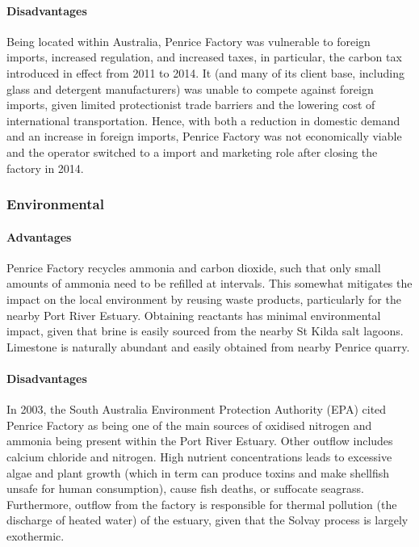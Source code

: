 \documentclass[12pt, a4paper]{article}
\begin{document}
\paragraph{Disadvantages}

Being located within Australia, Penrice Factory was vulnerable to foreign imports, increased regulation, and increased taxes, in particular, the carbon tax introduced in effect from 2011 to 2014. It (and many of its client base, including glass and detergent manufacturers) was unable to compete against foreign imports, given limited protectionist trade barriers and the lowering cost of international transportation. Hence, with both a reduction in domestic demand and an increase in foreign imports, Penrice Factory was not economically viable and the operator switched to a import and marketing role after closing the factory in 2014.

\subsubsection{Environmental}

\paragraph{Advantages}
Penrice Factory recycles ammonia and carbon dioxide, such that only small amounts of ammonia need to be refilled at intervals. This somewhat mitigates the impact on the local environment by reusing waste products, particularly for the nearby Port River Estuary. Obtaining reactants has minimal environmental impact, given that brine is easily sourced from the nearby St Kilda salt lagoons. Limestone is naturally abundant and easily obtained from nearby Penrice quarry.

\paragraph{Disadvantages}
In 2003, the South Australia Environment Protection Authority (EPA) cited Penrice Factory as being one of the main sources of oxidised nitrogen and ammonia being present within the Port River Estuary. Other outflow includes calcium chloride and nitrogen. High nutrient concentrations leads to excessive algae and plant growth (which in term can produce toxins and make shellfish unsafe for human consumption), cause fish deaths, or suffocate seagrass. Furthermore, outflow from the factory is responsible for thermal pollution (the discharge of heated water) of the estuary, given that the Solvay process is largely exothermic. 
\end{document}
